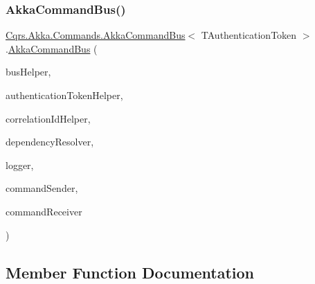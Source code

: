 \subsubsection{\texorpdfstring{Akka\+Command\+Bus()}{AkkaCommandBus()}}
{\footnotesize\ttfamily \hyperlink{classCqrs_1_1Akka_1_1Commands_1_1AkkaCommandBus}{Cqrs.\+Akka.\+Commands.\+Akka\+Command\+Bus}$<$ T\+Authentication\+Token $>$.\hyperlink{classCqrs_1_1Akka_1_1Commands_1_1AkkaCommandBus}{Akka\+Command\+Bus} (\begin{DoxyParamCaption}\item[{\hyperlink{interfaceCqrs_1_1Bus_1_1IBusHelper}{I\+Bus\+Helper}}]{bus\+Helper,  }\item[{\hyperlink{interfaceCqrs_1_1Authentication_1_1IAuthenticationTokenHelper}{I\+Authentication\+Token\+Helper}$<$ T\+Authentication\+Token $>$}]{authentication\+Token\+Helper,  }\item[{I\+Correlation\+Id\+Helper}]{correlation\+Id\+Helper,  }\item[{\hyperlink{interfaceCqrs_1_1Configuration_1_1IDependencyResolver}{I\+Dependency\+Resolver}}]{dependency\+Resolver,  }\item[{I\+Logger}]{logger,  }\item[{\hyperlink{interfaceCqrs_1_1Commands_1_1ICommandPublisher}{I\+Command\+Publisher}$<$ T\+Authentication\+Token $>$}]{command\+Sender,  }\item[{\hyperlink{interfaceCqrs_1_1Commands_1_1ICommandReceiver}{I\+Command\+Receiver}$<$ T\+Authentication\+Token $>$}]{command\+Receiver }\end{DoxyParamCaption})}



\subsection{Member Function Documentation}
\mbox{\label{classCqrs_1_1Akka_1_1Commands_1_1AkkaCommandBus_ae3e5f1725bceb0359aedb74ded530858_ae3e5f1725bceb0359aedb74ded530858}} 

